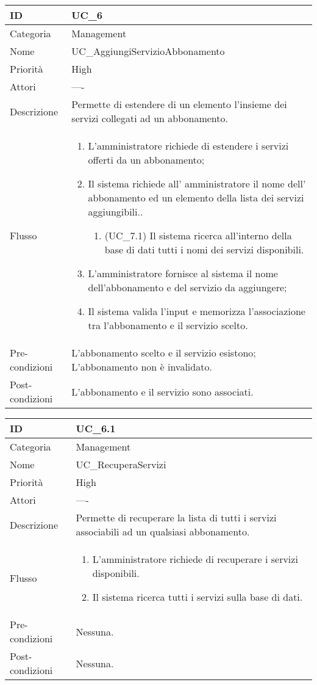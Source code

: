 \begin{center}
\begin{tabular}{ |p{2cm}|p{13cm}|  }
\hline
ID & UC\_6 \\\hline
Categoria & Management\\\hline
Nome & UC\_AggiungiServizioAbbonamento\\\hline
Priorità & High \\\hline
Attori &  ---- \\\hline
Descrizione & Permette di estendere di un elemento l'insieme dei servizi collegati ad un abbonamento.\\\hline
Flusso &  	\begin{enumerate}
			\item L'amministratore richiede di estendere i servizi offerti da un abbonamento;
			\item Il sistema richiede all' amministratore il nome dell' abbonamento ed un elemento della lista dei servizi aggiungibili..
			\begin{enumerate}
				\item (UC\_7.1) Il sistema ricerca all'interno della base di dati tutti i nomi dei servizi disponibili.
			\end{enumerate}
			\item L'amministratore fornisce al sistema il nome dell'abbonamento e del servizio da aggiungere;
			\item Il sistema valida l'input e memorizza l'associazione tra l'abbonamento e il servizio scelto.
		\end{enumerate}\\\hline
Pre-condizioni & L'abbonamento scelto e il servizio esistono;\newline 
			L'abbonamento non è invalidato.\\\hline
Post-condizioni &  L'abbonamento e il servizio sono associati.\\\hline
\end{tabular}
\label{table_use_case:6}\newline

\begin{tabular}{ |p{2cm}|p{13cm}|  }
\hline
ID & UC\_6.1 \\\hline
Categoria & Management\\\hline
Nome & UC\_RecuperaServizi\\\hline
Priorità & High \\\hline
Attori &  ---- \\\hline
Descrizione & Permette di recuperare la lista di tutti i servizi associabili ad un qualsiasi abbonamento.\\\hline
Flusso &  	\begin{enumerate}
			\item L'amministratore richiede di recuperare i servizi disponibili.
			\item Il sistema ricerca tutti i servizi sulla base di dati.
		\end{enumerate}\\\hline
Pre-condizioni &  Nessuna.\\\hline
Post-condizioni &  Nessuna.\\\hline
\end{tabular}
\label{table_use_case:6.1}\newline


\end{center}
